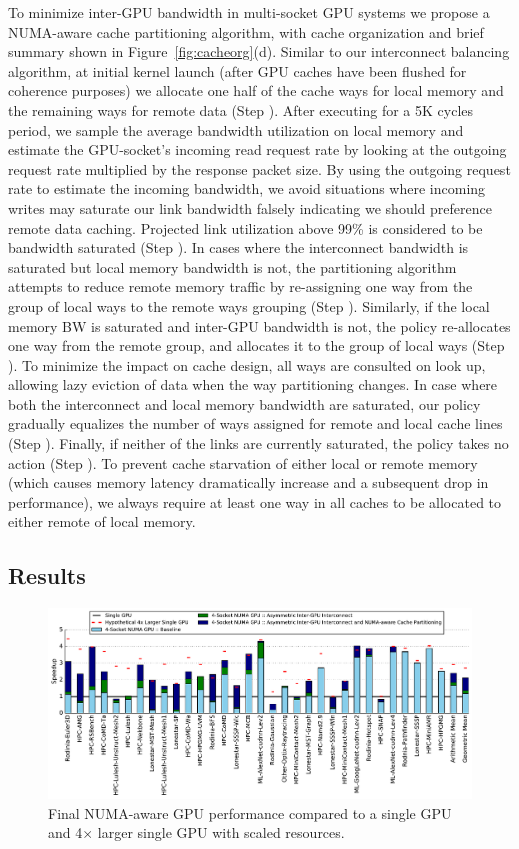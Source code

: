 To minimize inter-GPU bandwidth in multi-socket GPU systems we propose a
NUMA-aware cache partitioning algorithm, with cache organization and brief summary 
shown in Figure~\ref{fig:cacheorg}(d).  Similar to our interconnect balancing
algorithm, at initial kernel launch (after GPU caches have been flushed for
coherence purposes) we allocate one half of the cache ways for local memory and 
the remaining ways for remote data (Step ). After executing for a 5K cycles 
period, we sample the average bandwidth utilization on local memory and estimate
the GPU-socket's incoming read request rate by looking at the outgoing request rate
multiplied by the response packet size.  By using the outgoing request rate to estimate
the incoming bandwidth, we avoid situations where incoming writes may saturate
our link bandwidth falsely indicating we should preference remote data caching.
Projected link utilization above 99\% is considered to be bandwidth saturated 
(Step ). In cases where the interconnect bandwidth is saturated but
local memory bandwidth is not, the partitioning algorithm attempts to reduce remote 
memory traffic by re-assigning one way from the group of local ways to the
remote ways grouping (Step ).
Similarly, if the local memory BW is saturated and inter-GPU bandwidth is not, the policy 
re-allocates one way from the remote group, and allocates it to the group of local ways (Step 
).  To minimize the impact on cache design, all ways are consulted on look
up, allowing lazy eviction of data when the way partitioning changes.
In case where both the interconnect and local memory bandwidth 
are saturated, our policy gradually equalizes the number of ways assigned for remote 
and local cache lines (Step ). Finally, if neither of the links are 
currently saturated, the policy takes no action (Step ).  To prevent
cache starvation of either local or remote memory (which causes memory latency
dramatically increase and a subsequent drop in performance), we always require at 
least one way in all caches to be allocated to either remote of local memory.

\subsection{Results}

\begin{figure}[tp]
	\centering
	\includegraphics[width=1.0\textwidth]{figures/plot_final_speedup_WB_nvlink_first.pdf}
	\caption{Final NUMA-aware GPU performance compared to a single GPU and 4$\times$ larger single GPU with scaled resources.}
	\label{fig:combined}
\end{figure}

